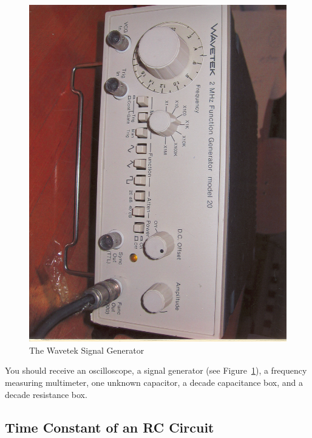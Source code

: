 \documentclass[12pt]{article}
\begin{document}
\begin{figure}
  \centering
  \includegraphics[angle=90,width=\textwidth/2]{figures/wavetek-signal-generator}
  \caption{The Wavetek Signal Generator}
  \label{fig:siggen}
\end{figure}
You should receive an oscilloscope, a signal generator (see
Figure~\ref{fig:siggen}), a frequency measuring multimeter, one
unknown capacitor, a decade capacitance box, and a decade resistance
box.

\subsection{Time Constant of an RC Circuit}
\label{sec:timeconst}
\end{document}
